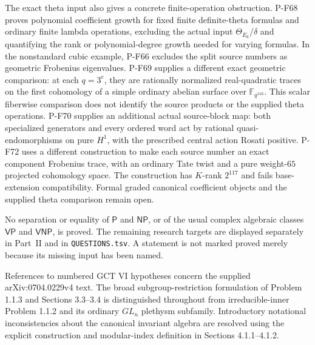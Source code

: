 The exact theta input also gives a concrete finite-operation
obstruction. P-F68 proves polynomial coefficient growth for fixed
finite definite-theta formulas and ordinary finite lambda operations,
excluding the actual input $\Theta_{E_6}/\delta$ and quantifying the
rank or polynomial-degree growth needed for varying formulas.
In the nonstandard cubic example, P-F66 excludes the split source
numbers as geometric Frobenius eigenvalues. P-F69 supplies a
different exact geometric comparison: at each $q=3^e$, they are
rationally normalized real-quadratic traces on the first cohomology
of a simple ordinary abelian surface over $\mathbb F_{q^{116}}$.
This scalar fiberwise comparison does not identify the source
products or the supplied theta operations.
P-F70 supplies an additional actual source-block map: both
specialized generators and every ordered word act by rational
quasi-endomorphisms on pure $H^1$, with the prescribed central
action Rosati positive.  P-F72 uses a different construction to
make each source number an exact component Frobenius trace,
with an ordinary Tate twist and a pure weight-$65$ projected
cohomology space.  The construction has $K$-rank $2^{117}$
and fails base-extension compatibility.  Formal graded
canonical coefficient objects and the supplied theta comparison
remain open.

No separation or equality of $\mathsf P$ and $\mathsf{NP}$, or of the
usual complex algebraic classes $\mathsf{VP}$ and $\mathsf{VNP}$, is
proved. The remaining research targets are displayed separately in
Part~II and in \texttt{QUESTIONS.tsv}. A statement is not marked proved
merely because its missing input has been named.

References to numbered GCT VI hypotheses concern the supplied
arXiv:0704.0229v4 text. The broad subgroup-restriction formulation
of Problem 1.1.3 and Sections 3.3--3.4 is distinguished throughout
from irreducible-inner Problem 1.1.2 and its ordinary $GL_n$
plethysm subfamily. Introductory notational inconsistencies about
the canonical invariant algebra are resolved using the explicit
construction and modular-index definition in Sections 4.1.1--4.1.2.

